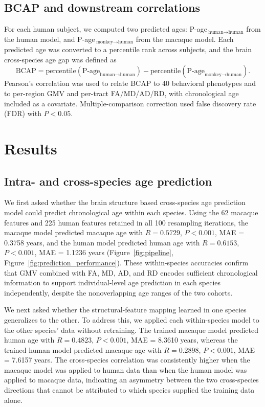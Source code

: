 \documentclass[11pt]{article}
\begin{document}
\subsection{BCAP and downstream correlations}

For each human subject, we computed two predicted ages: P-age\,$_{\text{human}\to\text{human}}$ from the human model, and P-age\,$_{\text{monkey}\to\text{human}}$ from the macaque model. Each predicted age was converted to a percentile rank across subjects, and the brain cross-species age gap was defined as
\begin{equation}
\text{BCAP} = \text{percentile}(\text{P-age}_{\text{human}\to\text{human}}) - \text{percentile}(\text{P-age}_{\text{monkey}\to\text{human}}).
\end{equation}
Pearson's correlation was used to relate BCAP to 40 behavioral phenotypes and to per-region GMV and per-tract FA/MD/AD/RD, with chronological age included as a covariate. Multiple-comparison correction used false discovery rate (FDR) with $P < 0.05$.

\section{Results}

\subsection{Intra- and cross-species age prediction}

We first asked whether the brain structure based cross-species age prediction model could predict chronological age within each species. Using the 62 macaque features and 225 human features retained in all 100 resampling iterations, the macaque model predicted macaque age with $R = 0.5729$, $P < 0.001$, MAE = 0.3758 years, and the human model predicted human age with $R = 0.6153$, $P < 0.001$, MAE = 1.1236 years (Figure~\ref{fig:pipeline}, Figure~\ref{fig:prediction_performance}). These within-species accuracies confirm that GMV combined with FA, MD, AD, and RD encodes sufficient chronological information to support individual-level age prediction in each species independently, despite the nonoverlapping age ranges of the two cohorts.

We next asked whether the structural-feature mapping learned in one species generalizes to the other. To address this, we applied each within-species model to the other species' data without retraining. The trained macaque model predicted human age with $R = 0.4823$, $P < 0.001$, MAE = 8.3610 years, whereas the trained human model predicted macaque age with $R = 0.2898$, $P < 0.001$, MAE = 7.6157 years. The cross-species correlation was consistently higher when the macaque model was applied to human data than when the human model was applied to macaque data, indicating an asymmetry between the two cross-species directions that cannot be attributed to which species supplied the training data alone.
\end{document}
